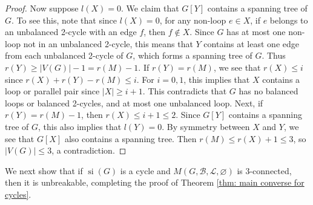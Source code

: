 \documentclass[12pt]{article}
\theoremstyle{definition}
\theoremstyle{plain} %
\newcommand{\cB}{\mathcal{B}}
\newcommand{\cL}{\mathcal{L}}
\DeclareMathOperator{\si}{si}
\begin{document}
\begin{proof}
   Now suppose $l(X)=0$. We claim that $G[Y]$ contains a spanning tree of $G$. To see this, note that since $l(X)=0$, for any non-loop $e\in X$, if $e$ belongs to an unbalanced 2-cycle with an edge $f$, then $f\notin X$. Since $G$ has at most one non-loop not in an unbalanced 2-cycle, this means that $Y$ contains at least one edge from each unbalanced 2-cycle of $G$, which forms a spanning tree of $G$. Thus $r(Y)\geq\lvert V(G)\rvert-1=r(M)-1$. If $r(Y)=r(M)$, we see that $r(X)\leq i$ since $r(X)+r(Y)-r(M)\leq i$. For $i=0,1$, this implies that $X$ contains a loop or parallel pair since $|X| \ge i + 1$. This contradicts that $G$ has no balanced loops or balanced 2-cycles, and at most one unbalanced loop. Next, if $r(Y)=r(M)-1$, then $r(X)\leq i+1 \leq 2$. Since $G[Y]$ contains a spanning tree of $G$, this also implies that $l(Y)=0$. By symmetry between $X$ and $Y$, we see that $G[X]$ also contains a spanning tree. 
   Then $r(M) \le r(X) + 1 \le 3$, so $\lvert V(G)\rvert\leq3$, a contradiction. 
\end{proof}


We next show that if $\si(G)$ is a cycle and $M(G, \cB, \cL, \varnothing)$ is $3$-connected, then it is unbreakable, completing the proof of Theorem \ref{thm: main converse for cycles}.
\end{document}
